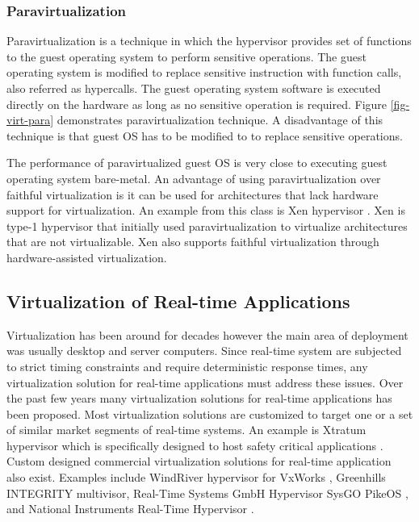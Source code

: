 \subsubsection{Paravirtualization}
Paravirtualization is a technique in which the hypervisor provides set of functions to the guest operating system to perform sensitive operations. 
The guest operating system is modified to replace sensitive instruction with function calls, also referred as hypercalls.
The guest operating system software is executed directly on the hardware as long as no sensitive operation is required. 
Figure \ref{fig-virt-para} demonstrates paravirtualization technique.
A disadvantage of this technique is that guest OS has to be modified to to replace sensitive operations.


The performance of paravirtualized guest OS is very close to executing guest operating system bare-metal.
An advantage of using paravirtualization over faithful virtualization is it can be used for architectures that lack hardware support for virtualization.
An example from this class is Xen hypervisor \cite{Barham:2003:XAV:1165389.945462}.
Xen is type-1 hypervisor that initially used paravirtualization to virtualize architectures that are not virtualizable. 
Xen also supports faithful virtualization through hardware-assisted virtualization.

\subsection{Virtualization of Real-time Applications}

Virtualization has been around for decades however the main area of deployment was usually desktop and server computers.
Since real-time system are subjected to strict timing constraints and require deterministic response times, any virtualization solution for real-time applications must address these issues.
Over the past few years many virtualization solutions for real-time applications has been proposed.
Most virtualization solutions are customized to target one or a set of similar market segments of real-time systems. 
An example is Xtratum hypervisor which is specifically designed to host safety critical applications \cite{Carrascosa:2014:XHR:2668138.2668142}.
Custom designed commercial virtualization solutions for real-time application also exist. 
Examples include WindRiver hypervisor for VxWorks \cite{bialowas2010achieving}, 
Greenhills INTEGRITY multivisor\cite{greenhills-multivisor}, 
Real-Time Systems GmbH Hypervisor \cite{realtime-systems-gmbh-hypervisor}
SysGO PikeOS \cite{kaiser2007pikeos}, 
and National Instruments Real-Time Hypervisor \cite{ni-realtime-hypervisor}.

